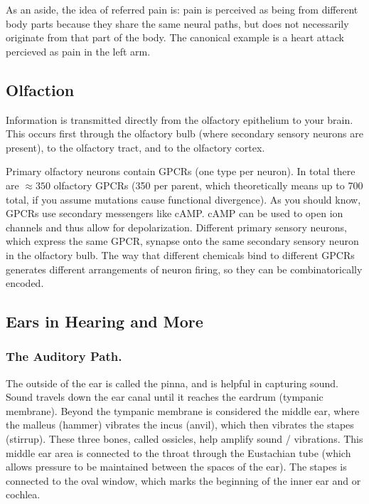 \documentclass[12pt]{report}
\begin{document}
As an aside, the idea of referred pain is: pain is perceived as being from different body parts because they share the same neural paths, but does not necessarily originate from that part of the body. The canonical example is a heart attack percieved as pain in the left arm.


\subsection{Olfaction}

Information is transmitted directly from the olfactory epithelium to your brain. This occurs first through the olfactory bulb (where secondary sensory neurons are present), to the olfactory tract, and to the olfactory cortex.\newline

Primary olfactory neurons contain GPCRs (one type per neuron). In total there are $\approx 350$ olfactory GPCRs (350 per parent, which theoretically means up to 700 total, if you assume mutations cause functional divergence). As you should know, GPCRs use secondary messengers like cAMP. cAMP can be used to open ion channels and thus allow for depolarization. Different primary sensory neurons, which express the same GPCR, synapse onto the same secondary sensory neuron in the olfactory bulb. The way that different chemicals bind to different GPCRs generates different arrangements of neuron firing, so they can be combinatorically encoded. 

\subsection{Ears in Hearing and More}

\subsubsection{The Auditory Path.}

The outside of the ear is called the pinna, and is helpful in capturing sound. Sound travels down the ear canal until it reaches the eardrum (tympanic membrane). Beyond the tympanic membrane is considered the middle ear, where the malleus (hammer) vibrates the incus (anvil), which then vibrates the stapes (stirrup). These three bones, called ossicles, help amplify sound / vibrations. This middle ear area is connected to the throat through the Eustachian tube (which allows pressure to be maintained between the spaces of the ear). The stapes is connected to the oval window, which marks the beginning of the inner ear and or cochlea.\newline
\end{document}
